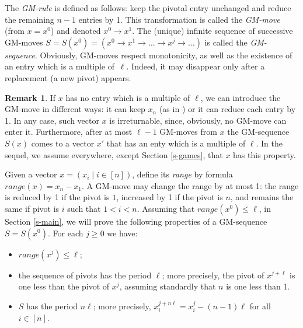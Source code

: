 \documentclass[10pt]{article}
\theoremstyle{definition}
\newtheorem{remark}{Remark}
\begin{document}
\medskip 

The {\em GM-rule} is defined as follows: 
keep the pivotal entry unchanged 
and reduce the remaining $n-1$ entries by 1.
This transformation is called the {\em GM-move} 
(from $x = x^0$)  and denoted  $x^0 \to x^1$.   
The (unique) infinite sequence of successive GM-moves \;\;
$S = S(x^0) = (x^0 \to x^1 \to \ldots \to x^j \to \ldots)$ 
is called the {\em GM-sequence}.
Obviously, GM-moves respect monotonicity, 
as well as the existence of an entry which is a multiple of~$\ell$. 
Indeed, it may disappear 
only after a replacement (a new pivot) appears.

\begin{remark}
If $x$ has no entry which is a multiple of $\ell$, 
we can introduce the GM-move in different ways: 
it can keep $x_n$ (as in \cite{GMMV23})   
or it can reduce each entry by 1. 
In any case, such vector  $x$ is irreturnable, 
since, obviously, no GM-move can enter it. 
Furthermore, after at most $\ell-1$  GM-moves 
from $x$  the GM-sequence $S(x)$  comes 
to a vector $x'$  
that has an enty which is a multiple of $\ell$.  
In the sequel, we assume everywhere, 
except Section \ref{s-games}, 
that $x$  has this property. 
\end{remark}
\medskip
   
Given a vector $x = (x_i \mid i \in [n])$, 
define its {\em range} by formula 
$range(x) = x_n - x_1$.
A GM-move may change the range by at most 1:  
the range is reduced by 1 if the pivot is $1$,   
increased by 1 if the pivot is  $n$, and 
remains the same if pivot is $i$  such that $1 < i < n$. 
Assuming that $range(x^0) \leq \ell$,  
in Section \ref{s-main},  
we will prove the following properties of a 
GM-sequence $S = S(x^0)$. For each $j \geq 0$ we have:    

\begin{itemize}
\item[(i)]  $range(x^j) \leq \ell$; %
\item[(ii)] the sequence of pivots has the period $\ell$; 
more precisely, the pivot of  $x^{j+\ell}$  is one less than 
the pivot of $x^j$, 
assuming standardly that $n$ is one less than 1. 
\item[(iii)] %
$S$ has the period $n \ell$; 
more precisely,  $x_i^{j + n \ell} = x_i^j - (n-1) \ell$   
for all  $i \in [n]$.  %
\end{itemize}
\end{document}

